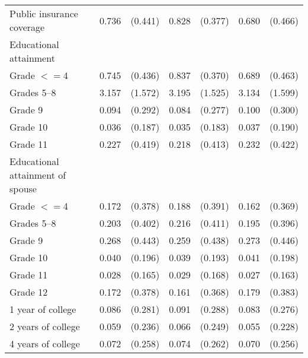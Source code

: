 \begin{tabular}{lcccccc}
 \hspace{0.3cm}  Public insurance coverage  & 0.736 & (0.441)  & 0.828 & (0.377)  & 0.680 & (0.466)  \\
 Educational attainment  & & &  \\
 \hspace{0.3cm} Grade $<=$4  & 0.745 & (0.436)  & 0.837 & (0.370)  & 0.689 & (0.463)  \\
 \hspace{0.3cm}  Grades 5--8  & 3.157 & (1.572)  & 3.195 & (1.525)  & 3.134 & (1.599)  \\
 \hspace{0.3cm} Grade 9  & 0.094 & (0.292)  & 0.084 & (0.277)  & 0.100 & (0.300)  \\
 \hspace{0.3cm} Grade 10  & 0.036 & (0.187)  & 0.035 & (0.183)  & 0.037 & (0.190)  \\
 \hspace{0.3cm} Grade 11  & 0.227 & (0.419)  & 0.218 & (0.413)  & 0.232 & (0.422)  \\
 Educational attainment of spouse  & & &  \\
 \hspace{0.3cm} Grade $<=$4  & 0.172 & (0.378)  & 0.188 & (0.391)  & 0.162 & (0.369)  \\
 \hspace{0.3cm}  Grades 5--8  & 0.203 & (0.402)  & 0.216 & (0.411)  & 0.195 & (0.396)  \\
 \hspace{0.3cm} Grade 9  & 0.268 & (0.443)  & 0.259 & (0.438)  & 0.273 & (0.446)  \\
 \hspace{0.3cm} Grade 10  & 0.040 & (0.196)  & 0.039 & (0.193)  & 0.041 & (0.198)  \\
 \hspace{0.3cm} Grade 11  & 0.028 & (0.165)  & 0.029 & (0.168)  & 0.027 & (0.163)  \\
 \hspace{0.3cm} Grade 12  & 0.172 & (0.378)  & 0.161 & (0.368)  & 0.179 & (0.383)  \\
 \hspace{0.3cm} 1 year of college  & 0.086 & (0.281)  & 0.091 & (0.288)  & 0.083 & (0.276)  \\
 \hspace{0.3cm} 2 years of college  & 0.059 & (0.236)  & 0.066 & (0.249)  & 0.055 & (0.228)  \\
 \hspace{0.3cm} 4 years of college  & 0.072 & (0.258)  & 0.074 & (0.262)  & 0.070 & (0.256)  \\

\end{tabular}
